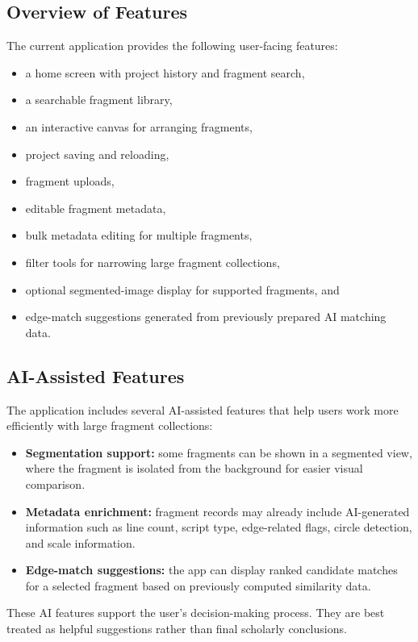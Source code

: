 \documentclass[12pt]{article}
\begin{document}
\subsection{Overview of Features}
The current application provides the following user-facing features:
\begin{itemize}
  \item a home screen with project history and fragment search,
  \item a searchable fragment library,
  \item an interactive canvas for arranging fragments,
  \item project saving and reloading,
  \item fragment uploads,
  \item editable fragment metadata,
  \item bulk metadata editing for multiple fragments,
  \item filter tools for narrowing large fragment collections,
  \item optional segmented-image display for supported fragments, and
  \item edge-match suggestions generated from previously prepared AI matching data.
\end{itemize}

\subsection{AI-Assisted Features}
The application includes several AI-assisted features that help users work more efficiently with large fragment collections:
\begin{itemize}
  \item \textbf{Segmentation support:} some fragments can be shown in a segmented view, where the fragment is isolated from the background for easier visual comparison.
  \item \textbf{Metadata enrichment:} fragment records may already include AI-generated information such as line count, script type, edge-related flags, circle detection, and scale information.
  \item \textbf{Edge-match suggestions:} the app can display ranked candidate matches for a selected fragment based on previously computed similarity data.
\end{itemize}

These AI features support the user's decision-making process. They are best treated as helpful suggestions rather than final scholarly conclusions.
\end{document}
